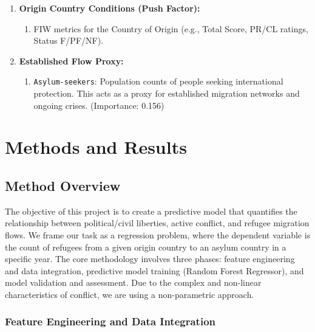 \documentclass{article}
\theoremstyle{plain}
\theoremstyle{definition}
\theoremstyle{remark}
\begin{document}
\begin{enumerate}
\begin{enumerate}
\begin{enumerate}
        \end{enumerate}
        \item \textbf{Origin Country Conditions (Push Factor):}
        \begin{enumerate}
            \item FIW metrics for the Country of Origin (e.g., Total Score, PR/CL ratings, Status F/PF/NF).
        \end{enumerate}
        \item \textbf{Established Flow Proxy:}
        \begin{enumerate}
            \item \texttt{Asylum-seekers}: Population counts of people seeking international protection. This acts as a proxy for established migration networks and ongoing crises. (Importance: 0.156)
        \end{enumerate}
    \end{enumerate}
\end{enumerate}


\section{Methods and Results}
\label{methods}

\subsection{Method Overview}
The objective of this project is to create a predictive model that quantifies the relationship between political/civil liberties, active conflict, and refugee migration flows. We frame our task as a regression problem, where the dependent variable is the count of refugees from a given origin country to an asylum country in a specific year. The core methodology involves three phases: feature engineering and data integration, predictive model training (Random Forest Regressor), and model validation and assessment. Due to the complex and non-linear characteristics of conflict, we are using a non-parametric approach.

\subsubsection*{Feature Engineering and Data Integration}
\end{document}
